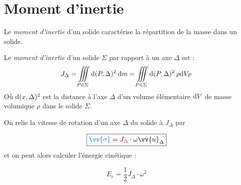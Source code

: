 \documentclass[11pt,a4paper,fleqn,pdftex]{report}
\begin{document}
\section{Moment d'inertie}
Le \emph{moment d'inertie} d'un solide caractérise la répartition de la masse dans un solide.
\begin{dfn}
  Le \emph{moment d'inertie} d'un solide $\Sigma$ par rapport à un axe $\Delta$ est :
  \begin{equation}
  J_\Delta = \iiint \limits_{P \in \Sigma} \mathrm{d} (P,\Delta)^2 \: \mathrm{d} m = \iiint \limits_{P \in \Sigma} \mathrm{d} (P,\Delta)^2 \: \rho \mathrm{d} V_P
  \end{equation}
  Où $\mathrm{d} (x,\Delta)^2$ est la distance à l'axe $\Delta$ d'un volume élémentaire $\mathrm{d} V$ de masse volumique $\rho$ dans le solide $\Sigma$.
\end{dfn}
\begin{theorem}
On relie la vitesse de rotation d'un axe $\Delta$ du solide à $J_\Delta$ par\\ 
\begin{minipage}{6cm}
\begin{equation}\label{eq:J}
\boxed{\textcolor{MidnightBlue}{\vv{\sigma}}=J_{\textcolor{Red}{\Delta}}\cdot \omega\vv{u}_\Delta}
\end{equation}
%
et on peut alors calculer l'énergie cinétique : 
\end{minipage}
\begin{minipage}{5cm}
\vspace{10pt}
\end{minipage}
\begin{equation}
E_c=\frac{1}{2}J_\Delta\cdot\omega^2
\end{equation}
\end{theorem}
\end{document}
